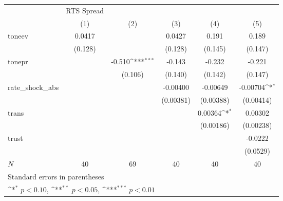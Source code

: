 {
\def\sym#1{\ifmmode^{#1}\else\(^{#1}\)\fi}
\begin{tabular}{l*{5}{c}}
\hline\hline
            &  RTS Spread         &                     &                     &                     &                     \\
            &\multicolumn{1}{c}{(1)}         &\multicolumn{1}{c}{(2)}         &\multicolumn{1}{c}{(3)}         &\multicolumn{1}{c}{(4)}         &\multicolumn{1}{c}{(5)}         \\
\hline
toneev      &      0.0417         &                     &      0.0427         &       0.191         &       0.189         \\
            &     (0.128)         &                     &     (0.128)         &     (0.145)         &     (0.147)         \\
[1em]
tonepr      &                     &      -0.510\sym{***}&      -0.143         &      -0.232         &      -0.221         \\
            &                     &     (0.106)         &     (0.140)         &     (0.142)         &     (0.147)         \\
[1em]
rate\_shock\_abs&                     &                     &    -0.00400         &    -0.00649         &    -0.00704\sym{*}  \\
            &                     &                     &   (0.00381)         &   (0.00388)         &   (0.00414)         \\
[1em]
trans       &                     &                     &                     &     0.00364\sym{*}  &     0.00302         \\
            &                     &                     &                     &   (0.00186)         &   (0.00238)         \\
[1em]
trust       &                     &                     &                     &                     &     -0.0222         \\
            &                     &                     &                     &                     &    (0.0529)         \\
\hline
\(N\)       &          40         &          69         &          40         &          40         &          40         \\
\hline\hline
\multicolumn{6}{l}{\footnotesize Standard errors in parentheses}\\
\multicolumn{6}{l}{\footnotesize \sym{*} \(p<0.10\), \sym{**} \(p<0.05\), \sym{***} \(p<0.01\)}\\
\end{tabular}
}
